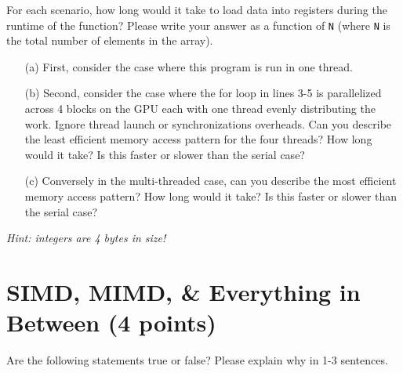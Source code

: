 \documentclass[]{article}
\begin{document}
\newpage

For each scenario, how long would it take to load data into registers during the runtime of the function? Please write your answer as a function of \texttt{N} (where \texttt{N} is the total number of elements in the array).

\begin{enumerate}
    \item[(a)] First, consider the case where this program is run in one thread.
    \item[(b)] Second, consider the case where the for loop in lines 3-5 is parallelized across 4 blocks on the GPU each with one thread evenly distributing the work. Ignore thread launch or synchronizations overheads. Can you describe the least efficient memory access pattern for the four threads? How long would it take? Is this faster or slower than the serial case?
    \item[(c)] Conversely in the multi-threaded case, can you describe the most efficient memory access pattern? How long would it take? Is this faster or slower than the serial case?
\end{enumerate}
\textit{Hint: integers are 4 bytes in size!}

\bigskip



\newpage

\section{SIMD, MIMD, \& Everything in Between (4 points)}
Are the following statements true or false? Please explain why in 1-3 sentences.
\end{document}
